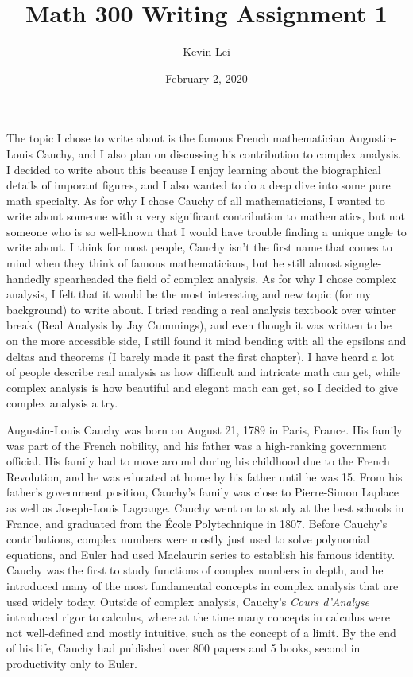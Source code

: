 \documentclass{article}
\title{Math 300 Writing Assignment 1}
\author{Kevin Lei}
\date{February 2, 2020}
\begin{document}
\maketitle

The topic I chose to write about is the famous French mathematician Augustin-Louis Cauchy, 
and I also plan on discussing his contribution to complex analysis.
I decided to write about this because I enjoy learning about the biographical details of imporant figures, 
and I also wanted to do a deep dive into some pure math specialty.
As for why I chose Cauchy of all mathematicians, I wanted to write about someone with a very significant contribution to mathematics,
but not someone who is so well-known that I would have trouble finding a unique angle to write about.
I think for most people, Cauchy isn't the first name that comes to mind when they think of famous mathematicians, 
but he still almost signgle-handedly spearheaded the field of complex analysis.
As for why I chose complex analysis, I felt that it would be the most interesting and new topic (for my background) to write about.
I tried reading a real analysis textbook over winter break (Real Analysis by Jay Cummings), and even though it was written to be on the more accessible side, 
I still found it mind bending with all the epsilons and deltas and theorems (I barely made it past the first chapter). 
I have heard a lot of people describe real analysis as how difficult and intricate math can get, 
while complex analysis is how beautiful and elegant math can get, so I decided to give complex analysis a try.

Augustin-Louis Cauchy was born on August 21, 1789 in Paris, France.
His family was part of the French nobility, and his father was a high-ranking government official.
His family had to move around during his childhood due to the French Revolution, 
and he was educated at home by his father until he was 15. 
From his father's government position, Cauchy's family was close to Pierre-Simon Laplace as well as Joseph-Louis Lagrange. 
Cauchy went on to study at the best schools in France, and graduated from the École Polytechnique in 1807.
Before Cauchy's contributions, complex numbers were mostly just used to solve polynomial equations, 
and Euler had used Maclaurin series to establish his famous identity. 
Cauchy was the first to study functions of complex numbers in depth, 
and he introduced many of the most fundamental concepts in complex analysis that are used widely today. 
Outside of complex analysis, Cauchy's \textit{Cours d'Analyse} introduced rigor to calculus, 
where at the time many concepts in calculus were not well-defined and mostly intuitive, such as the concept of a limit.
By the end of his life, Cauchy had published over 800 papers and 5 books, second in productivity only to Euler.
\end{document}
